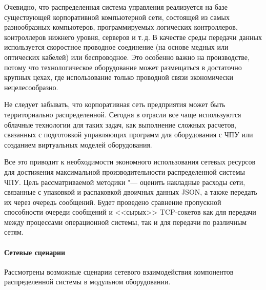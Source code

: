 Очевидно, что распределенная система управления реализуется на базе существующей корпоративной компьютерной сети, состоящей из самых разнообразных компьютеров, программируемых логических контроллеров, контроллеров нижнего уровня, серверов и т.\,д. В качестве среды передачи данных используется скоростное проводное соединение (на основе медных или оптических кабелей) или беспроводное. Это особенно важно на производстве, потому что технологическое оборудование может размещаться в достаточно крупных цехах, где использование только проводной связи экономически нецелесообразно.

Не следует забывать, что корпоративная сеть предприятия может быть территориально распределенной. Сегодня в отрасли все чаще используются облачные технологии для таких задач, как выполнение сложных расчетов, связанных с подготовкой управляющих программ для оборудования с ЧПУ или созданием виртуальных моделей оборудования.

Все это приводит к необходимости экономного использования сетевых ресурсов для достижения максимальной производительности распределенной системы ЧПУ. Цель рассматриваемой методики "--- оценить накладные расходы сети, связанные с упаковкой и распаковкой двоичных данных JSON, а также передать их через очередь сообщений. Будет проведено сравнение пропускной способности очереди сообщений и <<сырых>> TCP-сокетов как для передачи между процессами операционной системы, так и для передачи по различным сетям.

\paragraph{Сетевые сценарии}

Рассмотрены возможные сценарии сетевого взаимодействия компонентов распределенной системы в модульном оборудовании.


